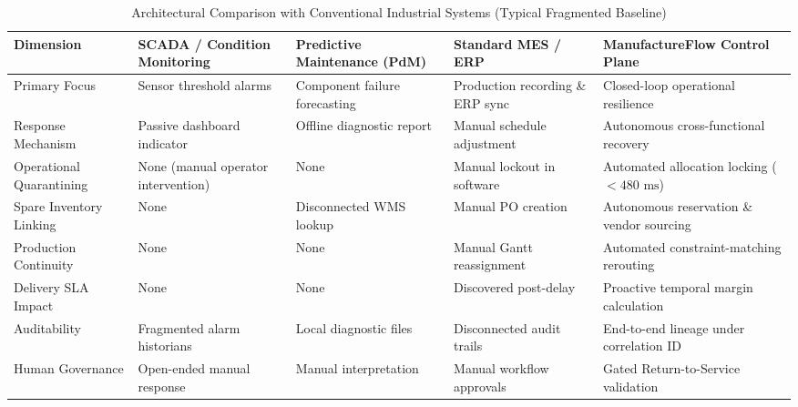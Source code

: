 \documentclass[10pt,twocolumn,a4paper]{article}
\begin{document}
\begin{table}[t]
\centering
\scriptsize
\caption{Architectural Comparison with Conventional Industrial Systems (Typical Fragmented Baseline)\label{tab:system_comparison}}
\begin{tabularx}{\textwidth}{>{\raggedright\arraybackslash}p{3.2cm}XXXX}
\toprule
\textbf{Dimension} & \textbf{SCADA / Condition Monitoring} & \textbf{Predictive Maintenance (PdM)} & \textbf{Standard MES / ERP} & \textbf{ManufactureFlow Control Plane} \\
\midrule
Primary Focus & Sensor threshold alarms & Component failure forecasting & Production recording \& ERP sync & Closed-loop operational resilience \\
Response Mechanism & Passive dashboard indicator & Offline diagnostic report & Manual schedule adjustment & Autonomous cross-functional recovery \\
Operational Quarantining & None (manual operator intervention) & None & Manual lockout in software & Automated allocation locking ($<480\text{ ms}$) \\
Spare Inventory Linking & None & Disconnected WMS lookup & Manual PO creation & Autonomous reservation \& vendor sourcing \\
Production Continuity & None & None & Manual Gantt reassignment & Automated constraint-matching rerouting \\
Delivery SLA Impact & None & None & Discovered post-delay & Proactive temporal margin calculation \\
Auditability & Fragmented alarm historians & Local diagnostic files & Disconnected audit trails & End-to-end lineage under correlation ID \\
Human Governance & Open-ended manual response & Manual interpretation & Manual workflow approvals & Gated Return-to-Service validation \\
\bottomrule
\end{tabularx}
\end{table}

\end{document}
